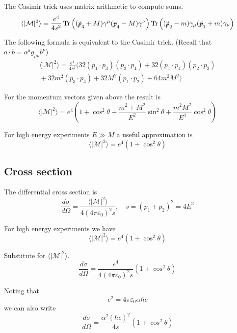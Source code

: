 \documentclass[12pt]{article}
\begin{document}
The Casimir trick uses matrix arithmetic to compute sums.
\begin{equation*}
\langle|\mathcal{M}|^2\rangle
=\frac{e^4}{4s^2}
\mathop{\rm Tr}\left((\slashed{p}_3+M)\gamma^\mu(\slashed{p}_4-M)\gamma^\nu\right)
\mathop{\rm Tr}\left((\slashed{p}_2-m)\gamma_\mu(\slashed{p}_1+m)\gamma_\nu\right)
\end{equation*}

The following formula is equivalent to the Casimir trick.
(Recall that $a\cdot b=a^\mu g_{\mu\nu}b^\nu$)
\begin{multline*}
\langle|\mathcal{M}|^2\rangle
=\frac{e^4}{4s^2}
\biggl(
32 (p_1\cdot p_3) (p_2\cdot p_4) +
32 (p_1\cdot p_4) (p_2\cdot p_3)
\\
{}+32 m^2 (p_3\cdot p_4) +
32 M^2 (p_1\cdot p_2) +
64 m^2 M^2
\biggr)
\end{multline*}

For the momentum vectors given above the result is
\begin{equation*}
\langle|\mathcal{M}|^2\rangle
=e^4\left(1+\cos^2\theta+\frac{m^2+M^2}{E^2}\sin^2\theta+\frac{m^2M^2}{E^4}\cos^2\theta\right)
\end{equation*}

For high energy experiments $E\gg M$ a useful approximation is
\begin{equation*}
\langle|\mathcal{M}|^2\rangle=e^4\left(1+\cos^2\theta\right)
\end{equation*}

\subsection*{Cross section}
The differential cross section is
\begin{equation*}
\frac{d\sigma}{d\Omega}
=\frac{\langle|\mathcal{M}|^2\rangle}{4(4\pi\varepsilon_0)^2s},
\quad s=(p_1+p_2)^2=4E^2
\end{equation*}

For high energy experiments we have
\begin{equation*}
\langle|\mathcal{M}|^2\rangle=e^4\left(1+\cos^2\theta\right)
\end{equation*}

Substitute for $\langle|\mathcal{M}|^2\rangle$.
\begin{equation*}
\frac{d\sigma}{d\Omega}=\frac{e^4}{4(4\pi\varepsilon_0)^2s}\left(1+\cos^2\theta\right)
\end{equation*}

Noting that
\begin{equation*}
e^2=4\pi\varepsilon_0\alpha\hbar c
\end{equation*}
we can also write
\begin{equation*}
\frac{d\sigma}{d\Omega}=\frac{\alpha^2(\hbar c)^2}{4s}\left(1+\cos^2\theta\right)
\end{equation*}
\end{document}
